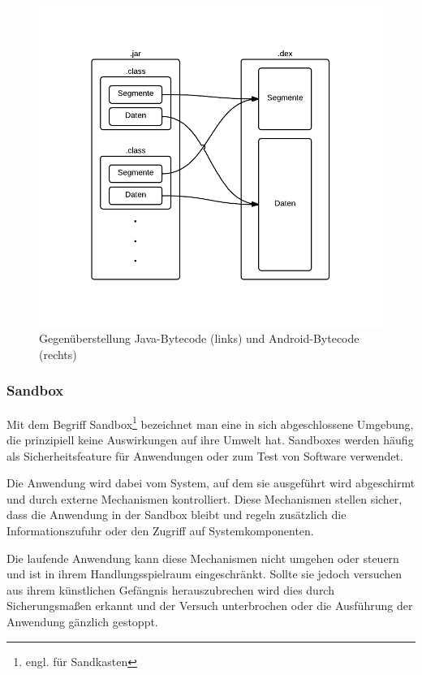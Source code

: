  \begin{figure}[h!t]
 \begin{center}
 \includegraphics[scale=0.5]{images/dexjar}
 \caption{Gegenüberstellung Java-Bytecode (links) und Android-Bytecode (rechts)}
 \label{dexjar}
 \end{center}
 \end{figure}
 
\subsubsection{Sandbox}
\label{sandbox}

Mit dem Begriff Sandbox\footnote{engl. für Sandkasten} bezeichnet man eine in sich abgeschlossene Umgebung, die prinzipiell keine Auswirkungen auf ihre Umwelt hat. Sandboxes werden häufig als Sicherheitsfeature für Anwendungen oder zum Test von Software verwendet.

Die Anwendung wird dabei vom System, auf dem sie ausgeführt wird abgeschirmt und durch externe Mechanismen kontrolliert. Diese Mechanismen stellen sicher, dass die Anwendung in der Sandbox bleibt und regeln zusätzlich die Informationszufuhr oder den Zugriff auf Systemkomponenten.

Die laufende Anwendung kann diese Mechanismen nicht umgehen oder steuern und ist in ihrem Handlungsspielraum eingeschränkt. Sollte sie jedoch versuchen aus ihrem künstlichen Gefängnis herauszubrechen wird dies durch Sicherungsmaßen erkannt und der Versuch unterbrochen oder die Ausführung der Anwendung gänzlich gestoppt.

